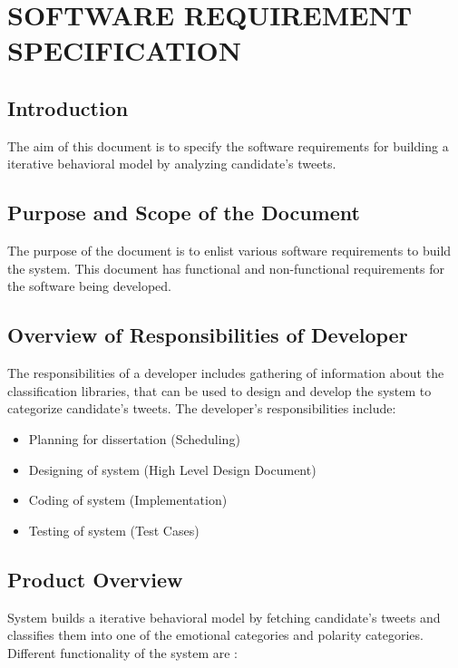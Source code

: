 \documentclass[oneside,a4paper,12pt]{pictreport}
\begin{document}
\chapter{SOFTWARE REQUIREMENT SPECIFICATION}

\section{Introduction}
The aim of this document is to specify the software requirements for building a iterative behavioral model by analyzing candidate's tweets. 

\section{Purpose and Scope of the Document}
The purpose of the document is to enlist various software requirements to build the system. This document has functional and non-functional requirements for the software being developed.

\section{Overview of Responsibilities of Developer}
The responsibilities of a developer includes gathering of information about the classification libraries, that can be used to design and develop the system to categorize candidate's tweets. The developer’s responsibilities include: 
\begin{itemize}
\item Planning for dissertation (Scheduling) 
\item Designing of system (High Level Design Document)
\item Coding of system (Implementation)
\item Testing of system (Test Cases)
\end{itemize}

\section{Product Overview}
System builds a iterative behavioral model by fetching candidate's tweets and classifies them into one of the emotional categories and polarity categories. Different functionality of the system are : 
\end{document}
